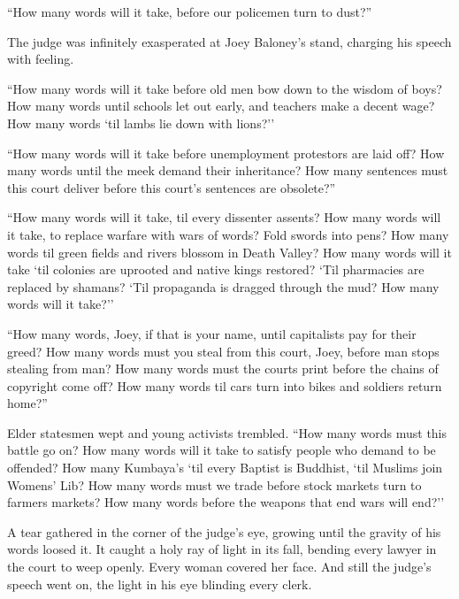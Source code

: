 \documentclass[oneside]{book}
\begin{document}
``How many words will it take, before our policemen turn to dust?''

The judge was infinitely exasperated at Joey Baloney's stand,
charging his speech with feeling.

``How many words will it take before old men bow down to the wisdom
of boys?
How many words until schools let out early, and teachers make a decent wage?
How many words `til lambs lie down with lions?''


``How many words will it take
before unemployment protestors are laid off?
How many words until the meek demand their inheritance?
How many sentences must this court deliver before this court's sentences are obsolete?''

``How many words will it take, til every dissenter assents?  How many words will it take,
to replace warfare with wars of words?  Fold swords into pens?
How many words til green fields and rivers
blossom in Death Valley?
How many words will it take `til
colonies are uprooted and native kings restored?  `Til pharmacies are replaced
by shamans?  `Til propaganda is dragged through the mud?  How many words will it take?''

``How many words, Joey, if that is your name, until capitalists pay for their greed?
How many words must you steal from this court,
Joey, before man stops stealing from man?  How many words must the courts print before
the chains of copyright come off?  How many words til cars turn into bikes
and soldiers return home?''

Elder statesmen wept and young activists trembled.
``How many words must this battle go on?
How many words will it take to satisfy people who demand to be offended?  How many Kumbaya's
`til every Baptist is Buddhist, `til Muslims join Womens' Lib?
How many words must we trade before stock markets turn to farmers
markets?
How many words before the weapons that end wars will end?''

A tear gathered in the corner of the judge's eye, growing until the gravity of
his words loosed it.
It caught a holy ray of light in its fall,
bending every lawyer in the court to weep openly.
Every woman covered her face.
And still the judge's speech went on, the light in his eye blinding every clerk.
\end{document}
